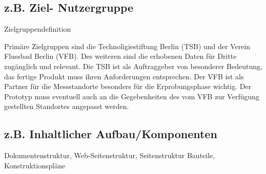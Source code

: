 \documentclass[
11pt,
a4paper,
ngerman,
]{article}
\newcommand{\descriptionWhat}[1]{%
	\begin{itshape}%
	#1 \\%
	\end{itshape}%
}
\begin{document}
\subsection{z.B. Ziel- Nutzergruppe}

\descriptionWhat{Zielgruppendefinition}

Primäre Zielgruppen sind die Technoligiestiftung Berlin (TSB) und der Verein Flussbad Berlin (VFB). Des weiteren  sind die erhobenen Daten für Dritte zugänglich und relevant. Die TSB ist als Auftraggeber von besonderer Bedeutung, das fertige Produkt muss ihren Anforderungen entsprechen. Der VFB ist als Partner für die Messstandorte besonders für die Erprobungsphase wichtig. Der Prototyp muss eventuell auch an die Gegebenheiten des vom VFB zur Verfügung gestellten Standortes angepasst werden.

\subsection{z.B. Inhaltlicher Aufbau/Komponenten}

\descriptionWhat{Dokumentenstruktur, Web-Seitenstruktur, Seitenstruktur Bauteile, Konstruktionspläne}
\end{document}
